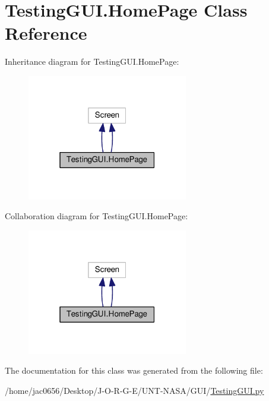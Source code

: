 \hypertarget{classTestingGUI_1_1HomePage}{}\section{Testing\+G\+U\+I.\+Home\+Page Class Reference}
\label{classTestingGUI_1_1HomePage}


Inheritance diagram for Testing\+G\+U\+I.\+Home\+Page\+:\nopagebreak
\begin{figure}[H]
\begin{center}
\leavevmode
\includegraphics[width=199pt]{classTestingGUI_1_1HomePage__inherit__graph}
\end{center}
\end{figure}


Collaboration diagram for Testing\+G\+U\+I.\+Home\+Page\+:\nopagebreak
\begin{figure}[H]
\begin{center}
\leavevmode
\includegraphics[width=199pt]{classTestingGUI_1_1HomePage__coll__graph}
\end{center}
\end{figure}


The documentation for this class was generated from the following file\+:\begin{DoxyCompactItemize}
\item 
/home/jac0656/\+Desktop/\+J-\/\+O-\/\+R-\/\+G-\/\+E/\+U\+N\+T-\/\+N\+A\+S\+A/\+G\+U\+I/\hyperlink{GUI_2TestingGUI_8py}{Testing\+G\+U\+I.\+py}\end{DoxyCompactItemize}
